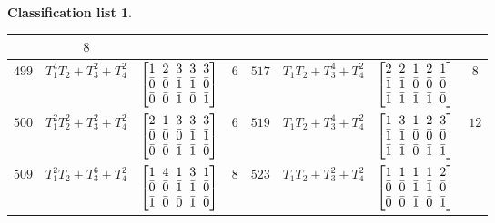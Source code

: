 \documentclass[pdftex]{sigma}%
\theoremstyle{definition}
\newtheorem{class-list}[thm]{Classification list}
\numberwithin{equation}{section}
\begin{document}
\begin{class-list}
\begin{table}[t!]
\begin{tabu}{c|c|c|c||c|c|c|c}
&${8}$
\\
\hline
${499}$&${T_{1}^{4}T_{2}+T_{3}^{2}+T_{4}^{2}}$
&$\arraycolsep=1mm\begin{bmatrix}{1} & {2} & {3} & {3} & {3} \\ {\bar{0}} & {\bar{0}} & {\bar{1}} & {\bar{1}} & {\bar{0}} \\ {\bar{0}} & {\bar{0}} & {\bar{1}} & {\bar{0}} & {\bar{1}}\end{bmatrix}$
&${6}$
&${517}$&${T_{1}T_{2}+T_{3}^{4}+T_{4}^{2}}$
&$\arraycolsep=1mm\begin{bmatrix}{2} & {2} & {1} & {2} & {1} \\ {\bar{1}} & {\bar{1}} & {\bar{0}} & {\bar{0}} & {\bar{0}} \\ {\bar{1}} & {\bar{1}} & {\bar{1}} & {\bar{1}} & {\bar{0}}\end{bmatrix}$
&${8}$
\\
\hline
${500}$&${T_{1}^{2}T_{2}^{2}+T_{3}^{2}+T_{4}^{2}}$
&$\arraycolsep=1mm\begin{bmatrix}{2} & {1} & {3} & {3} & {3} \\ {\bar{0}} & {\bar{0}} & {\bar{0}} & {\bar{1}} & {\bar{1}} \\ {\bar{0}} & {\bar{0}} & {\bar{1}} & {\bar{1}} & {\bar{0}}\end{bmatrix}$
&${6}$
&${519}$&${T_{1}T_{2}+T_{3}^{4}+T_{4}^{2}}$
&$\arraycolsep=1mm\begin{bmatrix}{1} & {3} & {1} & {2} & {3} \\ {\bar{1}} & {\bar{1}} & {\bar{0}} & {\bar{0}} & {\bar{0}} \\ {\bar{1}} & {\bar{1}} & {\bar{0}} & {\bar{1}} & {\bar{1}}\end{bmatrix}$
&${12}$
\\
\hline
${509}$&${T_{1}^{2}T_{2}+T_{3}^{6}+T_{4}^{2}}$
&$\arraycolsep=1mm\begin{bmatrix}{1} & {4} & {1} & {3} & {1} \\ {\bar{0}} & {\bar{0}} & {\bar{1}} & {\bar{1}} & {\bar{0}} \\ {\bar{1}} & {\bar{0}} & {\bar{0}} & {\bar{1}} & {\bar{0}}\end{bmatrix}$
&${8}$
&${523}$&${T_{1}T_{2}+T_{3}^{2}+T_{4}^{2}}$
&$\arraycolsep=1mm\begin{bmatrix}{1} & {1} & {1} & {1} & {2} \\ {\bar{0}} & {\bar{0}} & {\bar{1}} & {\bar{1}} & {\bar{0}} \\ {\bar{0}} & {\bar{0}} & {\bar{1}} & {\bar{0}} & {\bar{1}}\end{bmatrix}$

\end{tabu}
\end{table}
\end{class-list}
\end{document}
